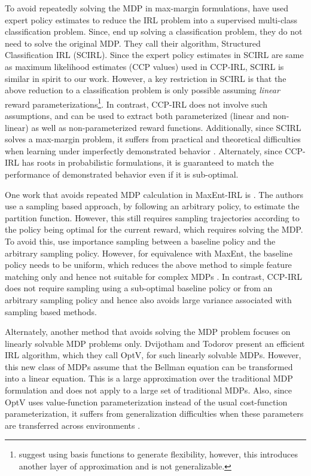 \documentclass{article}
\begin{document}
To avoid repeatedly solving the MDP in max-margin formulations, \cite{klein2012inverse} have used expert policy estimates to reduce the IRL problem into a supervised multi-class classification problem. Since, \cite{klein2012inverse} end up solving a classification problem, they do not need to solve the original MDP. They call their algorithm, Structured Classification IRL (SCIRL). Since the expert policy estimates in SCIRL are same as maximum likelihood estimates (CCP values) used in CCP-IRL, SCIRL is similar in spirit to our work. However, a key restriction in SCIRL is that the above reduction to a classification problem is only possible assuming \emph{linear} reward parameterizations\footnote{\cite{klein2012inverse} suggest using basis functions to generate flexibility, however, this introduces another layer of approximation and is not generalizable.}. In contrast, CCP-IRL does not involve such assumptions, and can be used to extract both parameterized (linear and non-linear) as well as non-parameterized reward functions. Additionally, since SCIRL solves a max-margin problem, it suffers from practical and theoretical difficulties when learning under imperfectly demonstrated behavior \cite{ziebart2010modeling}. Alternately, since CCP-IRL has roots in probabilistic formulations, it is guaranteed to match the performance of demonstrated behavior even if it is sub-optimal.

One work that avoids repeated MDP calculation in MaxEnt-IRL is \cite{boularias2011relative}. The authors use a sampling based approach, by following an arbitrary policy, to estimate the partition function. However, this still requires sampling trajectories according to the policy being optimal for the current reward, which requires solving the MDP. To avoid this, \cite{boularias2011relative} use importance sampling between a baseline policy and the arbitrary sampling policy. However, for equivalence with MaxEnt, the baseline policy needs to be uniform, which reduces the above method to simple feature matching only and hence not suitable for complex MDPs \cite{finn2016guided}. In contrast, CCP-IRL does not require sampling using a sub-optimal baseline policy or from an arbitrary sampling policy and hence also avoids large variance associated with sampling based methods.

Alternately, another method that avoids solving the MDP problem focuses on linearly solvable MDP problems only\cite{todorov2007linearly}. Dvijotham and Todorov  present an efficient IRL algorithm, which they call OptV, for such linearly solvable MDPs. However, this new class of MDPs assume that the Bellman equation can be transformed into a linear equation. This is a large approximation over the traditional MDP formulation and does not apply to a large set of traditional MDPs.
Also, since OptV uses value-function parameterization instead of the usual cost-function parameterization, it suffers from generalization difficulties when these parameters are transferred across environments \cite{ziebart_phd, levine2012continuous}.
\end{document}
